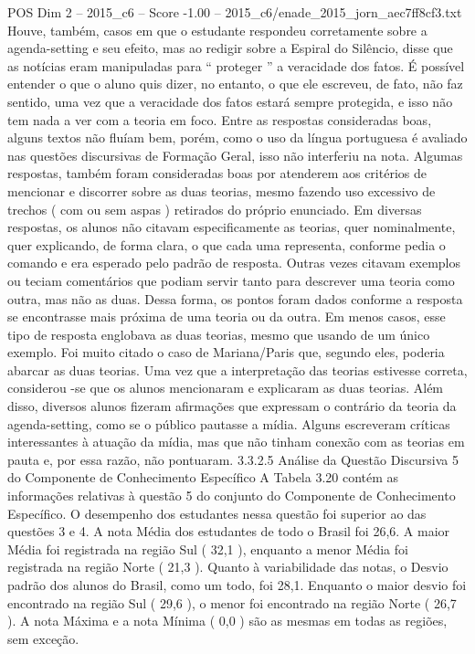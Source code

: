 \begin{textsample}{POS Dim 2 – 2015\_c6 – Score -1.00 – 2015\_c6/enade\_2015\_jorn\_aec7ff8cf3.txt}
Houve, também, casos em que o estudante respondeu corretamente sobre a agenda-setting e seu efeito, mas ao redigir sobre a Espiral do Silêncio, disse que as notícias eram manipuladas para “ proteger ” a veracidade dos fatos.
É possível entender o que o aluno quis dizer, no entanto, o que ele escreveu, de fato, não faz sentido, uma vez que a veracidade dos fatos estará sempre protegida, e isso não tem nada a ver com a teoria em foco.
Entre as respostas consideradas boas, alguns textos não fluíam bem, porém, como o uso da língua portuguesa é avaliado nas questões discursivas de Formação Geral, isso não interferiu na nota.
Algumas respostas, também foram consideradas boas por atenderem aos critérios de mencionar e discorrer sobre as duas teorias, mesmo fazendo uso excessivo de trechos ( com ou sem aspas ) retirados do próprio enunciado.
Em diversas respostas, os alunos não citavam especificamente as teorias, quer nominalmente, quer explicando, de forma clara, o que cada uma representa, conforme pedia o comando e era esperado pelo padrão de resposta.
Outras vezes citavam exemplos ou teciam comentários que podiam servir tanto para descrever uma teoria como outra, mas não as duas.
Dessa forma, os pontos foram dados conforme a resposta se encontrasse mais próxima de uma teoria ou da outra.
Em menos casos, esse tipo de resposta englobava as duas teorias, mesmo que usando de um único exemplo.
Foi muito citado o caso de Mariana/Paris que, segundo eles, poderia abarcar as duas teorias.
Uma vez que a interpretação das teorias estivesse correta, considerou -se que os alunos mencionaram e explicaram as duas teorias.
Além disso, diversos alunos fizeram afirmações que expressam o contrário da teoria da agenda-setting, como se o público pautasse a mídia.
Alguns escreveram críticas interessantes à atuação da mídia, mas que não tinham conexão com as teorias em pauta e, por essa razão, não pontuaram. 3.3.2.5 Análise da Questão Discursiva 5 do Componente de Conhecimento Específico A Tabela 3.20 contém as informações relativas à questão 5 do conjunto do Componente de Conhecimento Específico.
O desempenho dos estudantes nessa questão foi superior ao das questões 3 e 4.
A nota Média dos estudantes de todo o Brasil foi 26,6.
A maior Média foi registrada na região Sul ( 32,1 ), enquanto a menor Média foi registrada na região Norte ( 21,3 ).
Quanto à variabilidade das notas, o Desvio padrão dos alunos do Brasil, como um todo, foi 28,1.
Enquanto o maior desvio foi encontrado na região Sul ( 29,6 ), o menor foi encontrado na região Norte ( 26,7 ).
A nota Máxima e a nota Mínima ( 0,0 ) são as mesmas em todas as regiões, sem exceção.

\end{textsample}
